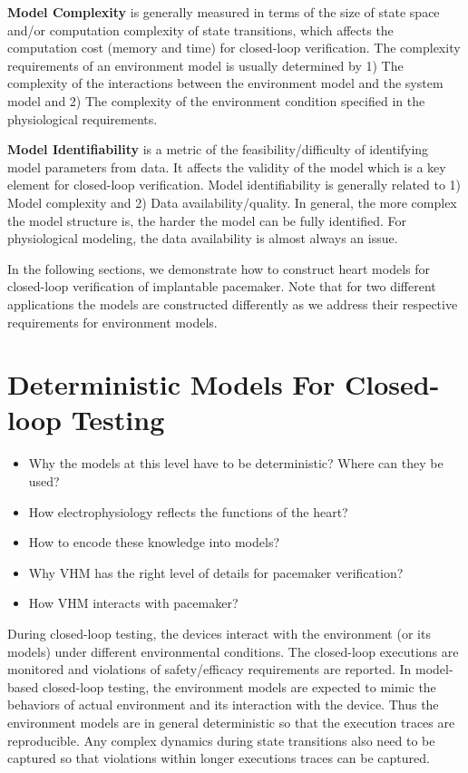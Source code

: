 \documentclass[openany]{now} %
\begin{document}
\textbf{Model Complexity} is generally measured in terms of the size of state space and/or computation complexity of state transitions, which affects the computation cost (memory and time) for closed-loop verification. The complexity requirements of an environment model is usually determined by 1) The complexity of the interactions between the environment model and the system model and 2) The complexity of the environment condition specified in the physiological requirements.

\textbf{Model Identifiability} is a metric of the feasibility/difficulty of identifying model parameters from data. It affects the validity of the model which is a key element for closed-loop verification. Model identifiability is generally related to 1) Model complexity and 2) Data availability/quality. In general, the more complex the model structure is, the harder the model can be fully identified. For physiological modeling, the data availability is almost always an issue.

In the following sections, we demonstrate how to construct heart models for closed-loop verification of implantable pacemaker. Note that for two different applications the models are constructed differently as we address their respective requirements for environment models. 


\section{Deterministic Models For Closed-loop Testing}
\begin{itemize}
	\item Why the models at this level have to be deterministic? Where can they be used?
    \item How electrophysiology reflects the functions of the heart?
    \item How to encode these knowledge into models?
    \item Why VHM has the right level of details for pacemaker verification?
    \item How VHM interacts with pacemaker?
    
\end{itemize}
During closed-loop testing, the devices interact with the environment (or its models) under different environmental conditions. The closed-loop executions are monitored and violations of safety/efficacy requirements are reported. In model-based closed-loop testing, the environment models are expected to mimic the behaviors of actual environment and its interaction with the device. Thus the environment models are in general deterministic so that the execution traces are reproducible. Any complex dynamics during state transitions also need to be captured so that violations within longer executions traces can be captured. 
\end{document}
